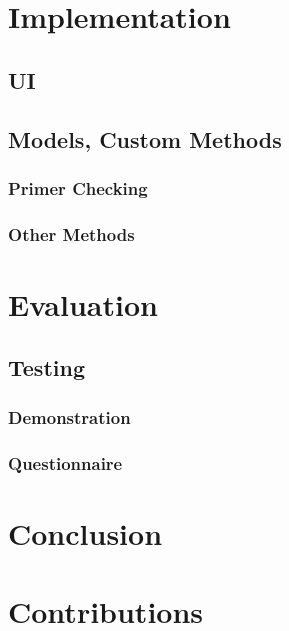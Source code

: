 \documentclass{l3proj}
\begin{document}
\chapter{Implementation}
\label{impl}

\section{UI}
\label{impl:ui}


\section{Models, Custom Methods}
\label{impl:models}

\subsection{Primer Checking}


\subsection{Other Methods}

\chapter{Evaluation}
\label{eval}

\section{Testing}
\label{eval:testing}

\subsection{Demonstration}
\label{eval:demo}

\subsection{Questionnaire}
\label{eval:question}

\chapter{Conclusion}
\label{conc}

\chapter{Contributions}
\label{contribs}


\clearpage


\end{document}
